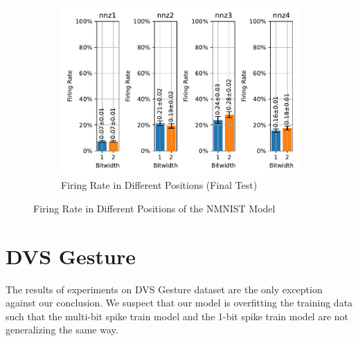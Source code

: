         \begin{figure}[H]
            \centering
            \ContinuedFloat
            \begin{subfigure}[H]{\textwidth}
                \centering
                \includegraphics[width=\textwidth]{../firerate/NMNIST/plots/nmnist_final_firerate.pdf}
                \caption{Firing Rate in Different Positions (Final Test)}
            \end{subfigure}
            \caption{Firing Rate in Different Positions of the NMNIST Model}
        \end{figure}

    \section{DVS Gesture}
    \label{appendix:firerate_dvs_gesture}
        The results of experiments on DVS Gesture dataset are the only exception against our conclusion. We suspect that our model is overfitting the training data such that the multi-bit spike train model and the 1-bit spike train model are not generalizing the same way. 

